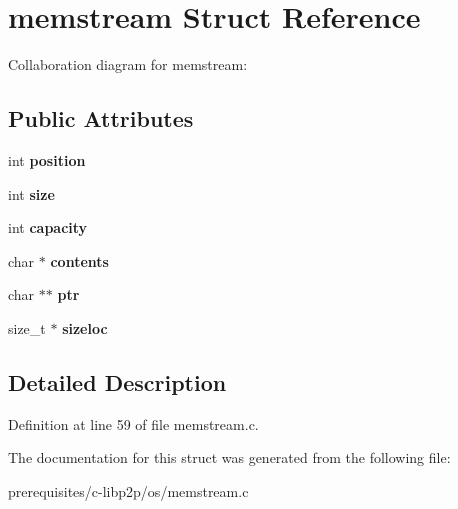 \hypertarget{structmemstream}{}\section{memstream Struct Reference}
\label{structmemstream}


Collaboration diagram for memstream\+:
\subsection*{Public Attributes}
\begin{DoxyCompactItemize}
\item 
\mbox{\label{structmemstream_a38f1edd101efa9c7d6eaf2c513a4c5a0}} 
int {\bfseries position}
\item 
\mbox{\label{structmemstream_aa636b07118baf8a0bd80af1f1c8d7d95}} 
int {\bfseries size}
\item 
\mbox{\label{structmemstream_ab2b47f5f9780e4f80da71c8f9756503e}} 
int {\bfseries capacity}
\item 
\mbox{\label{structmemstream_a7ef0dc050c0590ae2eea92648837c8c1}} 
char $\ast$ {\bfseries contents}
\item 
\mbox{\label{structmemstream_a1af4db237c9a126193661c04bcd62727}} 
char $\ast$$\ast$ {\bfseries ptr}
\item 
\mbox{\label{structmemstream_a7edc34a9b3cd446a302a8a7f271dbf23}} 
size\+\_\+t $\ast$ {\bfseries sizeloc}
\end{DoxyCompactItemize}


\subsection{Detailed Description}


Definition at line 59 of file memstream.\+c.



The documentation for this struct was generated from the following file\+:\begin{DoxyCompactItemize}
\item 
prerequisites/c-\/libp2p/os/memstream.\+c\end{DoxyCompactItemize}
